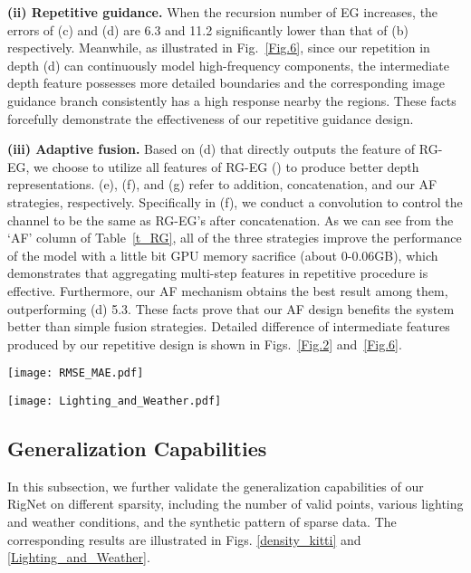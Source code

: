 \documentclass[runningheads]{llncs}
\begin{document}
\textbf{(ii) Repetitive guidance.} When the recursion number  of EG increases, the errors of (c) and (d) are 6.3 and 11.2 significantly lower than that of (b) respectively. Meanwhile, as illustrated in Fig.~\ref{Fig.6}, since our repetition in depth (d) can continuously model high-frequency components, the intermediate depth feature possesses more detailed boundaries and the corresponding image guidance branch consistently has a high response nearby the regions. These facts forcefully demonstrate the effectiveness of our repetitive guidance design.


\textbf{(iii) Adaptive fusion.} Based on (d) that directly outputs the feature of RG-EG, we choose to utilize all features of RG-EG () to produce better depth representations. (e), (f), and (g) refer to addition, concatenation, and our AF strategies, respectively. Specifically in (f), we conduct a  convolution to control the channel to be the same as RG-EG's after concatenation. As we can see from the `AF' column of Table~\ref{t_RG}, all of the three strategies improve the performance of the model with a little bit GPU memory sacrifice (about 0-0.06GB), which demonstrates that aggregating multi-step features in repetitive procedure is effective. Furthermore, our AF mechanism obtains the best result among them, outperforming (d) 5.3. These facts prove that our AF design benefits the system better than simple fusion strategies. Detailed difference of intermediate features produced by our repetitive design is shown in Figs.~\ref{Fig.2} and~\ref{Fig.6}.


\begin{figure*}[t]
  \centering
  \texttt{[image: RMSE\_MAE.pdf]}\\
  \caption{Comparisons under different levels of sparsity on KITTI validation split. The solid lines refer to our method while the dotted ones represent other approaches.}\label{density_kitti}
\end{figure*}


\begin{figure*}[t]
  \centering
  \texttt{[image: Lighting\_and\_Weather.pdf]}\\
  \caption{Comparisons with existing methods (left) and itself (right) replacing `RG' with `+', under different lighting and weather conditions on Virtual KITTI test split.}\label{Lighting_and_Weather}
\end{figure*}



\subsection{Generalization Capabilities}
In this subsection, we further validate the generalization capabilities of our RigNet on different sparsity, including the number of valid points, various lighting and weather conditions, and the synthetic pattern of sparse data. The corresponding results are illustrated in Figs. \ref{density_kitti} and \ref{Lighting_and_Weather}.
\end{document}
